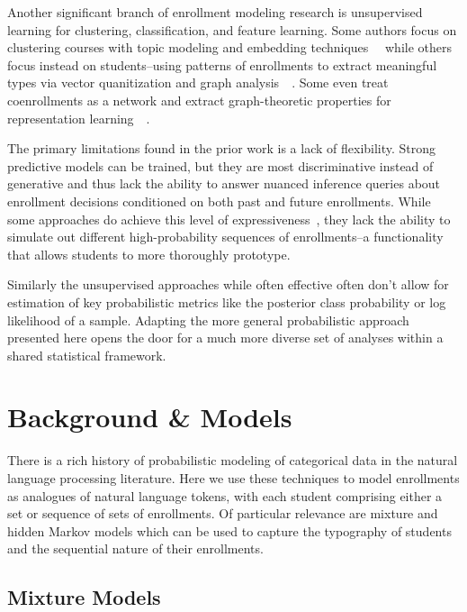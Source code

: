 \documentclass{edm_template}
\begin{document}
Another significant branch of enrollment modeling research is unsupervised learning for clustering, classification, and feature learning. Some authors focus on clustering courses with topic modeling and embedding techniques~\cite{Motz2018FindingTI}~\cite{Pardos2018AMO} while others focus instead on students--using patterns of enrollments to extract meaningful types via vector quanitization and graph analysis~\cite{Zeidenberg2011TheCO}~\cite{Slim2016TheIO}. Some even treat coenrollments as a network and extract graph-theoretic properties for representation learning~\cite{gardner2018coenrollment}~\cite{Wang2017AnalyzingCC}. 

The primary limitations found in the prior work is a lack of flexibility. Strong predictive models can be trained, but they are most discriminative instead of generative and thus lack the ability to answer nuanced inference queries about enrollment decisions conditioned on both past and future enrollments. While some approaches do achieve this level of expressiveness~\cite{Jiang2018GoalbasedCR}, they lack the ability to simulate out different high-probability sequences of enrollments--a functionality that allows students to more thoroughly prototype. 

Similarly the unsupervised approaches while often effective often don't allow for estimation of key probabilistic metrics like the posterior class probability or log likelihood of a sample. Adapting the more general probabilistic approach presented here opens the door for a much more diverse set of analyses within a shared statistical framework.

\section{Background \& Models}

There is a rich history of probabilistic modeling of categorical data in the natural language processing literature. Here we use these techniques to model enrollments as analogues of natural language tokens, with each student comprising either a set or sequence of sets of enrollments. Of particular relevance are mixture and hidden Markov models which can be used to capture the typography of students and the sequential nature of their enrollments. 

\subsection{Mixture Models}
\end{document}
